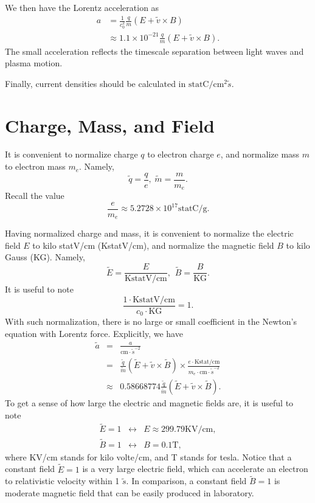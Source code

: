 \documentclass[paper=a4, fontsize=11pt]{scrartcl} %
\numberwithin{equation}{section} %
\numberwithin{figure}{section} %
\numberwithin{table}{section} %
\begin{document}
We then have the Lorentz acceleration as
\begin{align}
	a &= \frac{1}{c_0^2} \frac{q}{m} \left( E + \tilde{v} \times B \right)\\
	&\approx 1.1\times 10^{-21} \frac{q}{m} \left( E + \tilde{v} \times B \right).
\end{align}
The small acceleration reflects the timescale separation between light waves and plasma motion.

Finally, current densities should be calculated in $\text{statC} / \text{cm}^2 \tilde{s}$.

\section*{Charge, Mass, and Field}
It is convenient to normalize charge $q$ to electron charge $e$, and normalize mass $m$ to electron mass $m_e$. Namely,
\begin{equation}
	\tilde{q}=\frac{q}{e},\hspace{3pt} \tilde{m}=\frac{m}{m_e}.
\end{equation}
Recall the value
\begin{equation}
	\frac{e}{m_e}\approx 5.2728\times10^{17} \text{statC}/\text{g}.
\end{equation}

Having normalized charge and mass, it is convenient to normalize the electric field $E$ to kilo statV/cm (KstatV/cm), and normalize the magnetic field $B$ to kilo Gauss (KG). Namely,
\begin{equation}
	\tilde{E}=\frac{E}{\text{KstatV/cm}},\hspace{5pt} \tilde{B}=\frac{B}{\text{KG}}.
\end{equation}
It is useful to note
\begin{equation}
	\frac{1\cdot\text{KstatV/cm}}{c_0\cdot\text{KG}}=1.
\end{equation}
With such normalization, there is no large or small coefficient in the Newton's equation with Lorentz force. Explicitly, we have
\begin{eqnarray}
	\tilde{a}&=&\frac{a}{\text{cm}\cdot\tilde{s}^{-2}} \\
                 &=& \frac{\tilde{q}}{\tilde{m}}(\tilde{E}+\tilde{v}\times\tilde{B})
			\times\frac{e\cdot\text{Kstat/cm}}{m_e\cdot\text{cm}\cdot\tilde{s}^{-2}} \\
                 &\approx& 0.58668774 \frac{\tilde{q}}{\tilde{m}}(\tilde{E}+\tilde{v}\times\tilde{B}).
\end{eqnarray}
To get a sense of how large the electric and magnetic fields are, it is useful to note
\begin{eqnarray}
	\tilde{E}=1&\leftrightarrow& E\approx 299.79\text{KV/cm},\\
	\tilde{B}=1&\leftrightarrow& B=0.1\text{T},
\end{eqnarray}
where KV/cm stands for kilo volte/cm, and T stands for tesla. Notice that a constant field $\tilde{E}=1$ is a very large electric field, which can accelerate an electron to relativistic velocity within 1 $\tilde{s}$. In comparison, a constant field $\tilde{B}=1$ is moderate magnetic field that can be easily produced in laboratory.
\end{document}
